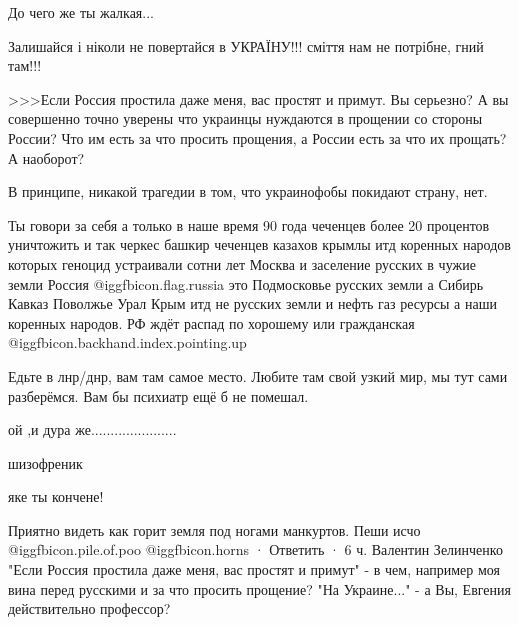 \begin{itemize}
До чего же ты жалкая...

Залишайся і ніколи не повертайся в УКРАЇНУ!!! сміття нам не потрібне, гний там!!!

>>>Если Россия простила даже меня, вас простят и примут.
Вы серьезно? А вы совершенно точно уверены что украинцы нуждаются в прощении со стороны России? Что им есть за что просить прощения, а России есть за что их прощать? А наоборот?

В принципе, никакой трагедии в том, что украинофобы покидают страну, нет.


Ты говори за себя а только в наше время 90 года чеченцев более 20 процентов
уничтожить и так черкес башкир чеченцев казахов крымлы итд коренных народов
которых геноцид устраивали сотни лет Москва и заселение русских в чужие земли
Россия @igg{fbicon.flag.russia} это Подмосковье русских земли а Сибирь Кавказ Поволжье Урал Крым
итд не русских земли и нефть газ ресурсы а наши коренных народов. РФ ждёт
распад по хорошему или гражданская  @igg{fbicon.backhand.index.pointing.up} 


Едьте в лнр/днр, вам там самое место. Любите там свой узкий мир, мы тут сами разберёмся. Вам бы психиатр ещё б не помешал.

ой ,и дура же......................

шизофреник

яке ты кончене!

Приятно видеть как горит земля под ногами манкуртов. Пеши исчо  @igg{fbicon.pile.of.poo}  @igg{fbicon.horns} 
 · Ответить · 6 ч.
Валентин Зелинченко
"Если Россия простила даже меня, вас простят и примут" - в чем, например моя вина перед русскими и за что просить прощение? "На Украине..." - а Вы, Евгения действительно профессор?

\end{itemize} %
